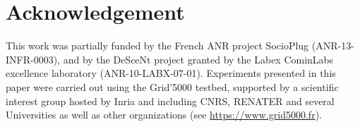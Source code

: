 \section*{Acknowledgement}

This work was partially funded by the French ANR project SocioPlug
(ANR-13-INFR-0003), and by the DeSceNt project granted by the Labex CominLabs
excellence laboratory (ANR-10-LABX-07-01).  Experiments presented in this paper
were carried out using the Grid'5000 testbed, supported by a scientific interest
group hosted by Inria and including CNRS, RENATER and several Universities as
well as other organizations (see \url{https://www.grid5000.fr}).
